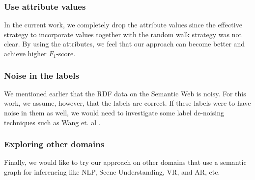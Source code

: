 \documentclass[runningheads,a4paper]{IEEEtran}
\begin{document}
\subsubsection{Use attribute values} 
In the current work, we completely drop the attribute values since the effective strategy to incorporate values together with the random walk strategy was not clear. By using the attributes, we feel that our approach can become better and achieve higher $F_1$-score.

\subsubsection{Noise in the labels}
We mentioned earlier that the RDF data on the Semantic Web is noisy. For this work, we assume, however, that the labels are correct. If these labels were to have noise in them as well, we would need to investigate some label de-noising techniques such as Wang et. al \cite{wang2014label}.

\subsubsection{Exploring other domains}
Finally, we would like to try our approach on other domains that use a semantic graph for inferencing like NLP, Scene Understanding, VR, and AR, etc.


\end{document}
